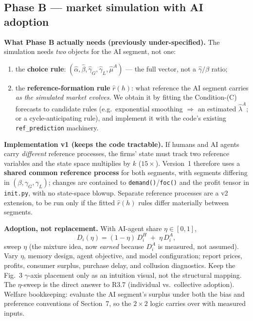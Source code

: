 \documentclass[11pt]{article}
\newcommand{\med}[1]{\textcolor{med}{#1}}
\begin{document}
\subsection*{Phase B --- market simulation with AI adoption}

\textbf{What Phase B actually needs (previously under-specified).} The simulation needs \emph{two} objects
for the AI segment, not one:
\begin{enumerate}
  \item the \textbf{choice rule}: $(\hat\alpha,\hat\beta,\hat\gamma_G,\hat\gamma_L,\hat\mu^{A})$ --- the
        full vector, not a $\hat\gamma/\hat\beta$ ratio;
  \item the \textbf{reference-formation rule} $\hat r(h)$: what reference the AI segment carries \emph{as
        the simulated market evolves}. We obtain it by fitting the Condition-(C) forecasts to candidate
        rules (e.g.\ exponential smoothing $\Rightarrow$ an estimated $\hat\lambda^{A}$; or a
        cycle-anticipating rule), and implement it with the code's existing
        \texttt{ref\_prediction} machinery.
\end{enumerate}

\noindent\textbf{Implementation v1 (keeps the code tractable).} If humans and AI agents carry
\emph{different} reference processes, the firms' state must track two reference variables and the state
space multiplies by $k$ ($15\times$). Version~1 therefore uses a \textbf{shared common reference process}
for both segments, with segments differing in $(\beta,\gamma_G,\gamma_L)$; changes are contained to
\texttt{demand()}/\texttt{foc()} and the profit tensor in \texttt{init.py}, with no state-space blowup.
Separate reference processes are a v2 extension, to be run only if the fitted $\hat r(h)$ rules differ
materially between segments.

\smallskip
\noindent\textbf{Adoption, not replacement.} With AI-agent share $\eta\in[0,1]$,
\[
D_i(\eta)=(1-\eta)\,D_i^{H}\;+\;\eta\,D_i^{A},
\]
sweep $\eta$ (the mixture idea, now \emph{earned} because $D_i^A$ is measured, not assumed). Vary $\eta$,
memory design, agent objective, and model configuration; report prices, profits, consumer surplus, purchase
delay, and collusion diagnostics. Keep the Fig.~3 $\gamma$-axis placement only as an intuition visual, not
the structural mapping. The $\eta$-sweep is the direct answer to \med{R3.7} (individual vs.\ collective
adoption). \med{Welfare bookkeeping:} evaluate the AI segment's surplus under both the bias and preference
conventions of Section~7, so the $2\times2$ logic carries over with measured inputs.
\end{document}
